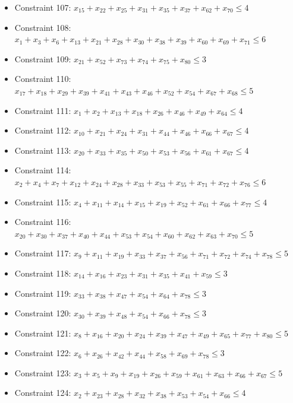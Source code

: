 \documentclass[11pt]{article}
\begin{document}
\begin{itemize}
\item Constraint 107: $x_{15} + x_{22} + x_{25} + x_{31} + x_{35} + x_{37} + x_{62} + x_{70} \le 4$
\item Constraint 108: $x_{1} + x_{3} + x_{6} + x_{13} + x_{21} + x_{28} + x_{30} + x_{38} + x_{39} + x_{60} + x_{69} + x_{71} \le 6$
\item Constraint 109: $x_{21} + x_{52} + x_{73} + x_{74} + x_{75} + x_{80} \le 3$
\item Constraint 110: $x_{17} + x_{18} + x_{29} + x_{39} + x_{41} + x_{43} + x_{46} + x_{52} + x_{54} + x_{67} + x_{68} \le 5$
\item Constraint 111: $x_{1} + x_{2} + x_{13} + x_{18} + x_{26} + x_{46} + x_{49} + x_{64} \le 4$
\item Constraint 112: $x_{10} + x_{21} + x_{24} + x_{31} + x_{44} + x_{46} + x_{66} + x_{67} \le 4$
\item Constraint 113: $x_{20} + x_{33} + x_{35} + x_{50} + x_{53} + x_{56} + x_{61} + x_{67} \le 4$
\item Constraint 114: $x_{2} + x_{4} + x_{7} + x_{12} + x_{24} + x_{28} + x_{33} + x_{53} + x_{55} + x_{71} + x_{72} + x_{76} \le 6$
\item Constraint 115: $x_{4} + x_{11} + x_{14} + x_{15} + x_{19} + x_{52} + x_{61} + x_{66} + x_{77} \le 4$
\item Constraint 116: $x_{20} + x_{30} + x_{37} + x_{40} + x_{44} + x_{53} + x_{54} + x_{60} + x_{62} + x_{63} + x_{70} \le 5$
\item Constraint 117: $x_{9} + x_{11} + x_{19} + x_{33} + x_{37} + x_{56} + x_{71} + x_{72} + x_{74} + x_{78} \le 5$
\item Constraint 118: $x_{14} + x_{16} + x_{23} + x_{31} + x_{35} + x_{41} + x_{59} \le 3$
\item Constraint 119: $x_{33} + x_{38} + x_{47} + x_{54} + x_{64} + x_{78} \le 3$
\item Constraint 120: $x_{30} + x_{39} + x_{48} + x_{54} + x_{66} + x_{78} \le 3$
\item Constraint 121: $x_{8} + x_{16} + x_{20} + x_{24} + x_{39} + x_{47} + x_{49} + x_{65} + x_{77} + x_{80} \le 5$
\item Constraint 122: $x_{6} + x_{26} + x_{42} + x_{44} + x_{58} + x_{69} + x_{78} \le 3$
\item Constraint 123: $x_{3} + x_{5} + x_{9} + x_{19} + x_{26} + x_{59} + x_{61} + x_{63} + x_{66} + x_{67} \le 5$
\item Constraint 124: $x_{2} + x_{23} + x_{28} + x_{32} + x_{38} + x_{53} + x_{54} + x_{66} \le 4$

\end{itemize}
\end{document}
